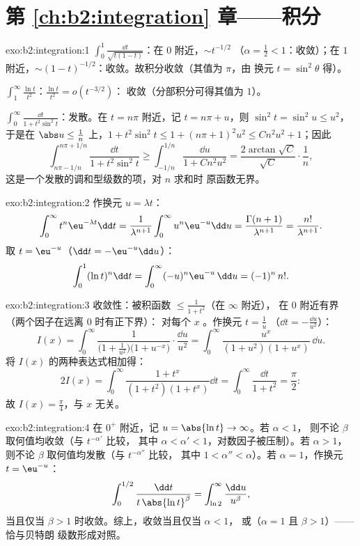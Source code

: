 \section*{第 \ref{ch:b2:integration} 章——积分}

\begin{solution}{exo:b2:integration:1}
$\int_0^1 \frac{\dd t}{\sqrt{t(1-t)}}$：在 $0$ 附近，$\sim t^{-1/2}$
（$\alpha = \frac12 < 1$：收敛）；在 $1$ 附近，$\sim
(1-t)^{-1/2}$：收敛。故积分收敛（其值为 $\pi$，由
换元 $t = \sin^2\theta$ 得）。

$\int_1^\infty \frac{\ln t}{t^2}$：$\frac{\ln t}{t^2} = o(t^{-3/2})$：
收敛（分部积分可得其值为 $1$）。

$\int_0^\infty \frac{\dd t}{1 + t^2\sin^2 t}$：发散。在 $t =
n\pi$ 附近，记 $t = n\pi + u$，则 $\sin^2 t = \sin^2 u \leq u^2$，于是在
$\abs u \leq \frac{1}{n}$ 上，$1 + t^2\sin^2 t \leq 1 + (n\pi +
1)^2u^2 \leq C n^2 u^2 + 1$；因此
\[
\int_{n\pi - 1/n}^{n\pi + 1/n} \frac{\dd t}{1 + t^2\sin^2 t}
\geq \int_{-1/n}^{1/n} \frac{\dd u}{1 + Cn^2u^2}
= \frac{2\arctan\sqrt C}{\sqrt C}\cdot\frac{1}{n} ,
\]
这是一个发散的调和型级数的项，对 $n$ 求和时
原函数无界。
\end{solution}

\begin{solution}{exo:b2:integration:2}
作换元 $u = \lambda t$：
\[
\int_0^\infty t^n \eu^{-\lambda t}\dd t
= \frac{1}{\lambda^{n+1}}\int_0^\infty u^n\eu^{-u}\dd u
= \frac{\Gamma(n+1)}{\lambda^{n+1}} = \frac{n!}{\lambda^{n+1}} .
\]
取 $t = \eu^{-u}$（$\dd t = -\eu^{-u}\dd u$）：
\[
\int_0^1 (\ln t)^n \dd t = \int_0^{\infty} (-u)^n \eu^{-u}\,\dd u
= (-1)^n\, n! .
\]
\end{solution}

\begin{solution}{exo:b2:integration:3}
收敛性：被积函数 $\leq \frac{1}{1+t^2}$（在 $\infty$ 附近），
在 $0$ 附近有界（两个因子在远离 $0$ 时有正下界）：
对每个 $x$ 。作换元 $t = \frac1u$
（$\dd t = -\frac{\dd u}{u^2}$）：
\[
I(x) = \int_0^\infty \frac{1}{\bigl(1 +
\frac1{u^2}\bigr)\bigl(1 + u^{-x}\bigr)}\cdot\frac{\dd u}{u^2}
= \int_0^\infty \frac{u^x}{(1 + u^2)(1 + u^x)}\,\dd u .
\]
将 $I(x)$ 的两种表达式相加得：
\[
2I(x) = \int_0^\infty \frac{1 + t^x}{(1+t^2)(1+t^x)}\dd t
= \int_0^\infty \frac{\dd t}{1 + t^2} = \frac{\pi}{2} :
\]
故 $I(x) = \frac\pi4$，与 $x$ 无关。
\end{solution}

\begin{solution}{exo:b2:integration:4}
在 $0^+$ 附近，记 $u = \abs{\ln t} \to \infty$。若 $\alpha < 1$，
则不论 $\beta$ 取何值均收敛（与 $t^{-\alpha'}$ 比较，
其中 $\alpha < \alpha' < 1$，对数因子被压制）。若 $\alpha > 1$，
则不论 $\beta$ 取何值均发散（与 $t^{-\alpha''}$ 比较，
其中 $1 < \alpha'' < \alpha$）。若 $\alpha = 1$，作换元 $t =
\eu^{-u}$：
\[
\int_0^{1/2} \frac{\dd t}{t\,\abs{\ln t}^\beta}
= \int_{\ln 2}^{\infty} \frac{\dd u}{u^\beta},
\]
当且仅当 $\beta > 1$ 时收敛。综上，收敛当且仅当 $\alpha < 1$，
或（$\alpha = 1$ 且 $\beta > 1$）——恰与贝特朗
级数形成对照。
\end{solution}

